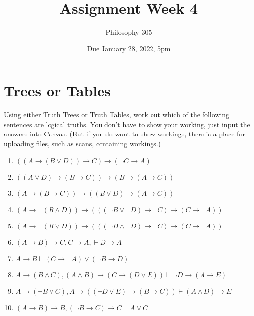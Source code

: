 \documentclass[
  11pt,
]{article}
\title{Assignment Week 4}
\author{Philosophy 305}
\date{Due January 28, 2022, 5pm}
\providecommand{\tightlist}{%
  \setlength{\itemsep}{0pt}\setlength{\parskip}{0pt}}
\begin{document}
\maketitle

\hypertarget{trees-or-tables}{%
\section{Trees or Tables}\label{trees-or-tables}}

Using either Truth Trees or Truth Tables, work out which of the
following sentences are logical truths. You don't have to show your
working, just input the answers into Canvas. (But if you do want to show
workings, there is a place for uploading files, such as scans,
containing workings.)

\begin{enumerate}
\def\labelenumi{\arabic{enumi}.}
\tightlist
\item
  \(((A \rightarrow (B \vee D)) \rightarrow C) \rightarrow (\neg C \rightarrow A)\)
\item
  \(((A \vee D) \rightarrow (B \rightarrow C)) \rightarrow (B \rightarrow (A \rightarrow C))\)
\item
  \((A \rightarrow (B \rightarrow C)) \rightarrow ((B \vee D) \rightarrow (A \rightarrow C))\)
\item
  \((A \rightarrow \neg (B \wedge D)) \rightarrow (((\neg B \vee \neg D) \rightarrow \neg C) \rightarrow (C \rightarrow \neg A))\)
\item
  \((A \rightarrow \neg (B \vee D)) \rightarrow (((\neg B \wedge \neg D) \rightarrow \neg C) \rightarrow (C \rightarrow \neg A))\)
\item
  \((A \rightarrow B) \rightarrow C, C \rightarrow A, \vdash D \rightarrow A\)
\item
  \(A \rightarrow B \vdash (C \rightarrow \neg A) \vee (\neg B \rightarrow D)\)
\item
  \(A \rightarrow (B \wedge C), (A \wedge B) \rightarrow (C \rightarrow (D \vee E)) \vdash \neg D \rightarrow (A \rightarrow E)\)
\item
  \(A \rightarrow (\neg B \vee C), A \rightarrow ((\neg D \vee E) \rightarrow (B \rightarrow C)) \vdash (A \wedge D) \rightarrow E\)
\item
  \((A \rightarrow B) \rightarrow B, (\neg B \rightarrow C) \rightarrow C \vdash A \vee C\)
\end{enumerate}
\end{document}
